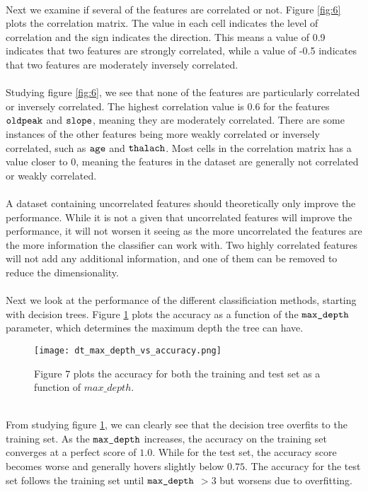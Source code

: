 \documentclass[a4paper,twocolumn]{article}
\begin{document}
\\
Next we examine if several of the features are correlated or not. Figure \ref{fig:6} plots the correlation matrix. The value in each cell indicates the level of correlation and the sign indicates the direction. This means a value of 0.9 indicates that two features are strongly correlated, while a value of -0.5 indicates that two features are moderately inversely correlated. \\
\\
Studying figure \ref{fig:6}, we see that none of the features are particularly correlated or inversely correlated. The highest correlation value is 0.6 for the features $\verb"oldpeak"$ and $\verb"slope"$, meaning they are moderately correlated. There are some instances of the other features being more weakly correlated or inversely correlated, such as $\verb"age"$ and $\verb"thalach"$. Most cells in the correlation matrix has a value closer to 0, meaning the features in the dataset are generally not correlated or weakly correlated.
\\
\\
A dataset containing uncorrelated features should theoretically only improve the performance. While it is not a given that uncorrelated features will improve the performance, it will not worsen it seeing as the more uncorrelated the features are the more information the classifier can work with. Two highly correlated features will not add any additional information, and one of them can be removed to reduce the dimensionality. \\
\\
Next we look at the performance of the different classificiation methods, starting with decision trees. Figure \ref{fig:7} plots the accuracy as a function of the $\verb"max_depth"$ parameter, which determines the maximum depth the tree can have.
\begin{figure}[ht]
    \centering
    \texttt{[image: dt\_max\_depth\_vs\_accuracy.png]}
    \caption{Figure 7 plots the accuracy for both the training and test set as a function of $max\_depth$.}
    \label{fig:7}
\end{figure}\\
From studying figure \ref{fig:7}, we can clearly see that the decision tree overfits to the training set. As the $\verb"max_depth"$ increases, the accuracy on the training set converges at a perfect score of $1.0$. While for the test set, the accuracy score becomes worse and generally hovers slightly below $0.75$. The accuracy for the test set follows the training set until $\verb"max_depth"$ $> 3$ but worsens due to overfitting. \\
\end{document}
